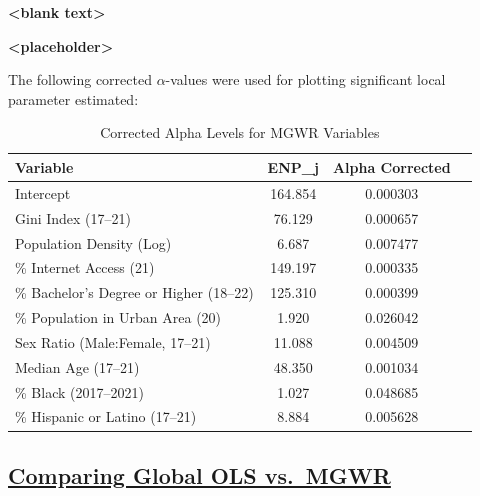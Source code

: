 \documentclass[
]{article}
\begin{document}
\textbf{\textless blank text\textgreater{}}

\textbf{\textless placeholder\textgreater{}}

The following corrected \(\alpha\)-values were used for plotting
significant local parameter estimated:

\begin{table}[H]
\renewcommand{\arraystretch}{1.3} %
\setlength{\tabcolsep}{12pt} %
\centering
\caption{Corrected Alpha Levels for MGWR Variables}
\label{tab:variable_enps}
\begin{tabular}{lccc}
\hline
\textbf{Variable} & \textbf{ENP\_j} & \textbf{Alpha Corrected} \\ \hline
Intercept                 & 164.854 & 0.000303 \\ 
Gini Index (17–21)        & 76.129  & 0.000657 \\ 
Population Density (Log)  & 6.687   & 0.007477 \\ 
\% Internet Access (21)   & 149.197 & 0.000335 \\ 
\% Bachelor's Degree or Higher (18–22) & 125.310 & 0.000399 \\ 
\% Population in Urban Area (20) & 1.920 & 0.026042 \\ 
Sex Ratio (Male:Female, 17–21) & 11.088 & 0.004509 \\ 
Median Age (17–21)        & 48.350  & 0.001034 \\ 
\% Black (2017–2021)      & 1.027   & 0.048685 \\ 
\% Hispanic or Latino (17–21) & 8.884 & 0.005628 \\ 
\hline
\end{tabular}
\end{table}

\newpage

\subsection{\texorpdfstring{\ul{Comparing Global OLS
vs.~MGWR}}{Comparing Global OLS vs.~MGWR}}\label{comparing-global-ols-vs.-mgwr}
\end{document}
